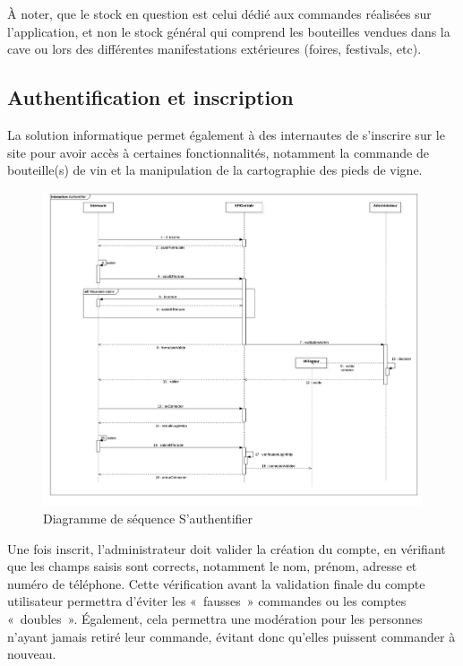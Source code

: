 \documentclass[a4paper, titlepage]{report}
\begin{document}
À noter, que le stock en question est celui dédié aux commandes
réalisées sur l'application, et non le stock général qui comprend les
bouteilles vendues dans la cave ou lors des différentes manifestations
extérieures (foires, festivals, etc).

\subsection{Authentification et inscription}

La solution informatique permet également à des internautes de
s'inscrire sur le site pour avoir accès à certaines fonctionnalités,
notamment la commande de bouteille(s) de vin et la manipulation de la
cartographie des pieds de vigne.

\begin{figure}[!h]
\centering
\includegraphics{Images/SequenceDiagramAuthentifier.jpg}
\caption{Diagramme de séquence S'authentifier}
\end{figure}

Une fois inscrit, l'administrateur doit valider la création du compte,
en vérifiant que les champs saisis sont corrects, notamment le nom,
prénom, adresse et numéro de téléphone. Cette vérification avant la
validation finale du compte utilisateur permettra d'éviter les
«~fausses~» commandes ou les comptes «~doubles~». Également, cela
permettra une modération pour les personnes n'ayant jamais retiré leur
commande, évitant donc qu'elles puissent commander à nouveau.
\end{document}
